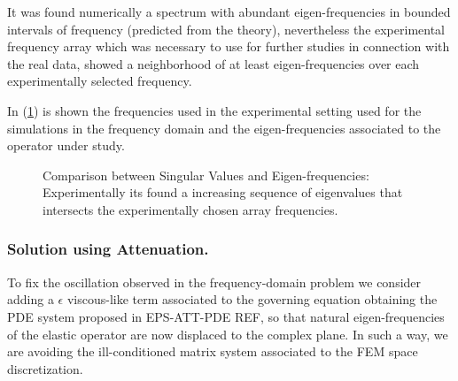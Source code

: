 It was found numerically a spectrum with abundant eigen-frequencies in bounded intervals of frequency (predicted from the theory), nevertheless the experimental frequency array which was necessary to use for further studies in connection with the real data, showed a neighborhood of at least eigen-frequencies over each experimentally selected frequency. 

In (\ref{EigenValuesComparison}) is shown the frequencies used in the experimental setting used for the simulations in the frequency domain and the eigen-frequencies associated to the operator under study.

\begin{figure}%
    \centering
    \qquad
    \caption{Comparison between Singular Values and Eigen-frequencies: Experimentally its found a increasing sequence of eigenvalues that intersects the experimentally chosen array frequencies.}%
    \label{EigenValuesComparison}%
\end{figure}


\subsubsection{Solution using Attenuation.}
To fix the oscillation observed in the frequency-domain problem we consider adding a $\epsilon$ viscous-like term associated to the governing equation obtaining the PDE system proposed in EPS-ATT-PDE REF, so that natural eigen-frequencies of the elastic operator are now displaced to the complex plane. In such a way, we are avoiding the ill-conditioned matrix system associated to the FEM space discretization.

